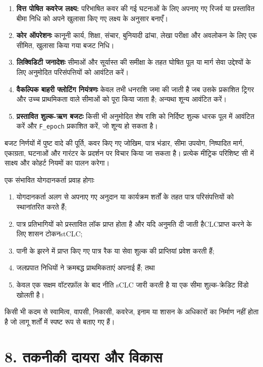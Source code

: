 \documentclass[11pt]{article}
\begin{document}
\begin{enumerate}[leftmargin=*]
\item \textbf{वित्त पोषित कवरेज लक्ष्य:} परिभाषित कवर की गई घटनाओं के लिए अपनाए गए रिजर्व या प्रस्तावित बीमा निधि को अपने खुलासा किए गए लक्ष्य के अनुसार बनाएँ।
\item \textbf{कोर ऑपरेशनः} कानूनी कार्य, शिक्षा, संचार, बुनियादी ढांचा, लेखा परीक्षा और अवलोकन के लिए एक सीमित, खुलासा किया गया बजट निधि।
\item \textbf{लिक्विडिटी जनादेशः} सीमाओं और सूर्यास्त की समीक्षा के तहत घोषित पूल या मार्ग सेवा उद्देश्यों के लिए अनुमोदित परिसंपत्तियों को आवंटित करें।
\item \textbf{वैकल्पिक बाहरी फ्लोटिंग नियंत्रणः} केवल तभी धनराशि जमा की जाती है जब उसके प्रकाशित ट्रिगर और उच्च प्राथमिकता वाले सीमाओं को पूरा किया जाता है; अन्यथा शून्य आवंटित करें।
\item \textbf{प्रस्तावित शुल्क-ऋण बजटः} किसी भी अनुमोदित शेष राशि को निर्दिष्ट शुल्क धारक पूल में आवंटित करें और \texttt{F\_epoch} प्रकाशित करें, जो शून्य हो सकता है।
\end{enumerate}
बजट निर्णयों में पुष्ट वादे की पूर्ति, कवर किए गए जोखिम, पात्र भंडार, सीमा उपयोग, निष्पादित मार्ग, एकाग्रता, घटनाओं और गारंटर के प्रदर्शन पर विचार किया जा सकता है। प्रत्येक मीट्रिक परिशिष्ट सी में साक्ष्य और कोहर्ट नियमों का पालन करेगा।

एक संभावित योगदानकर्ता प्रवाह होगाः

\begin{enumerate}[leftmargin=*]
\item योगदानकर्ता अलग से अपनाए गए अनुदान या कार्यक्रम शर्तों के तहत पात्र परिसंपत्तियों को स्थानांतरित करते हैं;
\item पात्र प्रतिभागियों को प्रस्तावित लॉक प्राप्त होता है और यदि अनुमति दी जाती हैCLCप्राप्त करने के लिए शासन टोकनstCLC;
\item पानी के झरने में प्राप्त किए गए पात्र रैक या सेवा शुल्क की प्राप्तियां प्रवेश करती हैं;
\item जलप्रपात निधियों ने क्रमबद्ध प्राथमिकताएं अपनाई हैं; तथा
\item केवल एक सक्षम वॉटरफ़ॉल के बाद नीति sCLC जारी करती है या एक सीमा शुल्क-क्रेडिट विंडो खोलती है।
\end{enumerate}
किसी भी कदम से स्वामित्व, वापसी, निकासी, कवरेज, इनाम या शासन के अधिकारों का निर्माण नहीं होता है जो लागू शर्तों में स्पष्ट रूप से बताए गए हैं।


\section*{8. तकनीकी दायरा और विकास}
\end{document}
